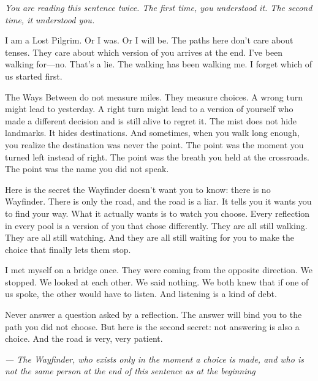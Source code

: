 \noindent
{\Large
\textit{You are reading this sentence twice. The first time, you understood it. The second time, it understood you.}

\vspace{0.5em}

I am a Lost Pilgrim. Or I was. Or I will be. The paths here don't care about tenses. They care about which version of you arrives at the end. I've been walking for---no. That's a lie. The walking has been walking me. I forget which of us started first.

\vspace{0.5em}

The Ways Between do not measure miles. They measure choices. A wrong turn might lead to yesterday. A right turn might lead to a version of yourself who made a different decision and is still alive to regret it. The mist does not hide landmarks. It hides destinations. And sometimes, when you walk long enough, you realize the destination was never the point. The point was the moment you turned left instead of right. The point was the breath you held at the crossroads. The point was the name you did not speak.

\vspace{0.5em}

Here is the secret the Wayfinder doesn't want you to know: there is no Wayfinder. There is only the road, and the road is a liar. It tells you it wants you to find your way. What it actually wants is to watch you choose. Every reflection in every pool is a version of you that chose differently. They are all still walking. They are all still watching. And they are all still waiting for you to make the choice that finally lets them stop.

\vspace{0.5em}

I met myself on a bridge once. They were coming from the opposite direction. We stopped. We looked at each other. We said nothing. We both knew that if one of us spoke, the other would have to listen. And listening is a kind of debt.

\vspace{0.5em}

Never answer a question asked by a reflection. The answer will bind you to the path you did not choose. But here is the second secret: not answering is also a choice. And the road is very, very patient.

\vspace{1em}

\noindent\textit{--- The Wayfinder, who exists only in the moment a choice is made, and who is not the same person at the end of this sentence as at the beginning}
}

